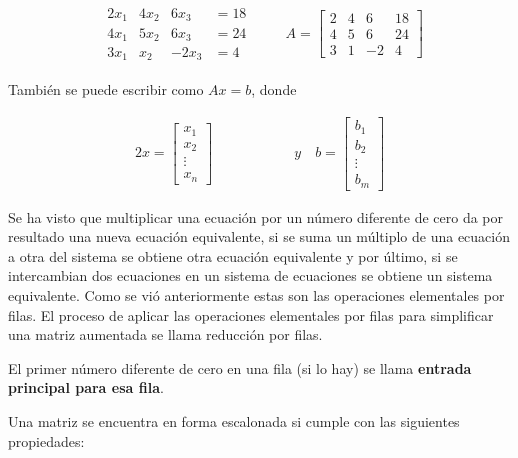 \documentclass{article}
\begin{document}
\begin{equation*}
    \begin{matrix}
        \begin{array}{rrrr}
            2x_1 & 4x_2 & 6x_3 &=18\\
            4x_1 & 5x_2 & 6x_3 &=24\\
            3x_1 & x_2  & -2x_3 &=4            
        \end{array}
    \end{matrix}
    \quad \quad A = \left[\begin{array}{rrr|r}
        2 & 4 & 6 & 18\\
        4 & 5 & 6 & 24\\
        3 & 1 & -2& 4
    \end{array}\right]
\end{equation*}

También se puede escribir como $Ax = b$, donde 

\begin{alignat*}{2}
    x= \begin{bmatrix}
        x_1\\
        x_2\\
        \vdots\\
        x_n
    \end{bmatrix} 
& \hspace{ 4em}%
\quad y \quad b = 
    \begin{bmatrix}
        b_1\\
        b_2\\
        \vdots\\
        b_m
    \end{bmatrix} 
\end{alignat*}

Se ha visto que multiplicar una ecuación por un número diferente de cero da por resultado una nueva ecuación equivalente, si se suma un múltiplo de una ecuación a otra del sistema se obtiene otra ecuación equivalente y por último, si se intercambian dos ecuaciones en un sistema de ecuaciones se obtiene un sistema equivalente. Como se vió anteriormente estas son las operaciones elementales por filas. El proceso de aplicar las operaciones elementales por filas para simplificar una matriz aumentada se llama reducción por filas. 

El primer número diferente de cero en una fila (si lo hay) se llama \textbf{entrada principal para esa fila}. 

Una matriz se encuentra en forma escalonada si cumple con las siguientes propiedades:
\end{document}
